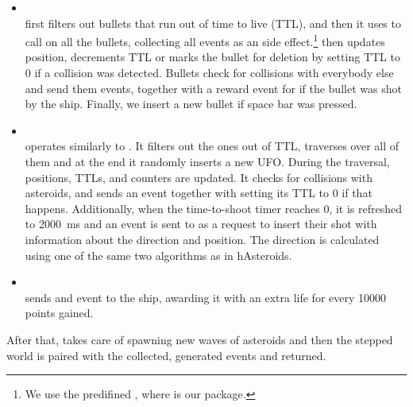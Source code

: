 \documentclass[
  digital, %
  color,   %
  table,   %
  oneside, %
  lof,     %
  lot,     %
]{fithesis3}
\begin{document}
{\begin{itemize}[--]
    \item {}\\
    first filters out bullets that run out of time to live (TTL), and then it uses 
    to call  on all the bullets, collecting all events as an
     side effect.\footnote{
    We use the predifined ,
    where  is our  package.}
     then updates position, decrements TTL or marks the bullet for
    deletion by setting TTL to 0 if a collision was detected. Bullets check for collisions
    with everybody else and send them events, together with a reward event for 
    if the bullet was shot by the ship.
    Finally, we insert a new bullet if space bar was pressed.

    \item {}\\
    operates similarly to . It filters out the ones out of TTL,
    traverses over all of them and at the end it randomly inserts a new UFO.
    During the traversal, positions, TTLs, and  counters are updated.
    It checks for collisions with asteroids, and sends an event together with setting its TTL
    to 0 if that happens. Additionally, when the time-to-shoot timer reaches 0, it is refreshed
    to 2000~ms and an event is sent to  as a request to insert their shot
    with information about the direction and position. The direction is calculated using
    one of the same two algorithms as in hAsteroids.

    \item {}\\
    sends and event to the ship, awarding it with an extra life for every 10\thinspace{}000 points gained.
\end{itemize}
After that,  takes care of spawning new waves of asteroids
and then the stepped world is paired with the collected, generated events and returned.

}
\end{document}
